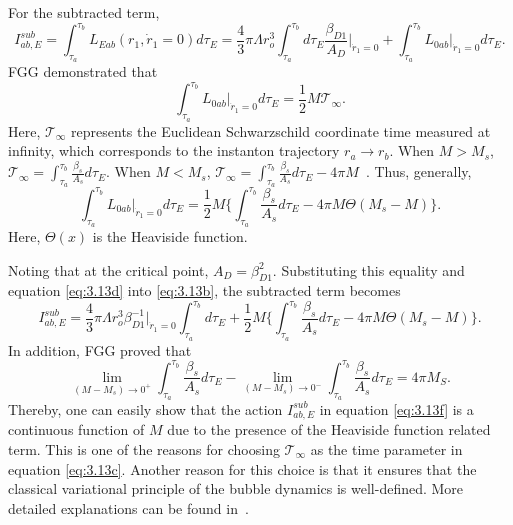 \documentclass[12pt]{article}
\begin{document}
For the subtracted term,
\begin{equation}
\label{eq:3.13b}%
I^{sub}_{ab,E}=\int_{\tau_{a}}^{\tau_{b}}L_{Eab}(r_{1},\dot{r}_{1}=0)d\tau_{E}=\frac{4}{3}\pi\Lambda r_{o}^{3}\int_{\tau_{a}}^{\tau_{b}}d\tau_{E}\frac{\beta_{D1}}{A_{D}}\Big|_{\dot{r}_{1}=0}+\int_{\tau_{a}}^{\tau_{b}}L_{0ab}\Big|_{\dot{r}_{1}=0} d\tau_{E}.
\end{equation}
FGG demonstrated that~\cite{EAJ}
\begin{equation}
\label{eq:3.13c}%
\int_{\tau_{a}}^{\tau_{b}}L_{0ab}\Big|_{\dot{r}_{1}=0}d\tau_{E}=\frac{1}{2}M\mathscr{T}_{\infty}.
\end{equation}
Here, $\mathscr{T}_{\infty}$ represents the Euclidean Schwarzschild coordinate time measured at infinity, which corresponds to the instanton trajectory $r_{a}\rightarrow r_{b}$.  When $M>M_{s}$, $\mathscr{T}_{\infty}=\int_{\tau_{a}}^{\tau_{b}}\frac{\beta_{s}}{A_{s}}d\tau_{E}$. When $M<M_{s}$, $\mathscr{T}_{\infty}=\int_{\tau_{a}}^{\tau_{b}}\frac{\beta_{s}}{A_{s}}d\tau_{E}-4\pi M$~\cite{EAJ}.  Thus, generally,
\begin{equation}
\label{eq:3.13d}%
\int_{\tau_{a}}^{\tau_{b}}L_{0ab}\Big|_{\dot{r}_{1}=0}d\tau_{E}=\frac{1}{2}M\big\{\int_{\tau_{a}}^{\tau_{b}}\frac{\beta_{s}}{A_{s}}d\tau_{E}-4\pi M\Theta(M_{s}-M)\big\}.
\end{equation}
Here, $\Theta(x)$ is the Heaviside function.

Noting that at the critical point, $A_{D}=\beta_{D1}^{2}$. Substituting this equality and equation \eqref{eq:3.13d} into \eqref{eq:3.13b}, the subtracted term becomes
\begin{equation}
\label{eq:3.13f}
I^{sub}_{ab,E}=\frac{4}{3}\pi\Lambda r_{o}^{3}\beta_{D1}^{-1}\Big|_{\dot{r}_{1}=0}\int_{\tau_{a}}^{\tau_{b}}d\tau_{E}+\frac{1}{2}M\big\{\int_{\tau_{a}}^{\tau_{b}}\frac{\beta_{s}}{A_{s}}d\tau_{E}-4\pi M\Theta(M_{s}-M)\big\}.
\end{equation}
In addition, FGG proved that
\begin{equation}
\label{eq:3.18a}
\lim_{(M-M_{s})\rightarrow0^{+}}\int_{\tau_{a}}^{\tau_{b}}\frac{\beta_{s}}{A_{s}}d\tau_{E}-\lim_{(M-M_{s})\rightarrow0^{-}}\int_{\tau_{a}}^{\tau_{b}}\frac{\beta_{s}}{A_{s}}d\tau_{E}=4\pi M_{S}.
\end{equation}
Thereby, one can easily show that the action $I^{sub}_{ab,E}$ in equation \eqref{eq:3.13f} is a continuous function of $M$ due to the presence of the Heaviside function related term.
This is one of the reasons for choosing $\mathscr{T}_{\infty}$ as the time parameter in equation \eqref{eq:3.13c}. Another reason for this choice is that it ensures that the classical variational principle of the bubble dynamics is well-defined. More detailed explanations can be found in~\cite{EAJ}.
\end{document}
